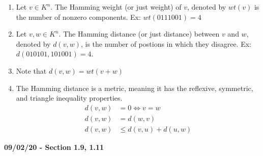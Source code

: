 \documentclass[11pt]{article}
\newcommand{\skipline}{\vspace{\baselineskip}}
\begin{document}
\begin{enumerate}
		\newpage
		\item Let $v \in K^n$. The Hamming weight (or just weight) of $v$, denoted by $wt(v)$ is the number of nonzero components. Ex: $wt(0111001) = 4$ 
		\item Let $v,w \in K^n$. The Hamming distance (or just distance) between $v$ and $w$, denoted by $d(v,w)$, is the number of postions in which they disagree. Ex: $d(010101,101001) = 4$. 
		\item Note that $d(v,w) = wt(v + w)$
		\item The Hamming distance is a metric, meaning it has the reflexive, symmetric, and triangle inequality properties.
		\begin{align*}
			d(v,w) &= 0 \Longleftrightarrow v = w \tag{Reflexive} \\
			d(v,w) &= d(w,v) \tag{Symmetric} \\
			d(v,w) &\leq d(v,u) + d(u,w) \tag{Triangle Inequality} 
		\end{align*}
	\end{enumerate}
	\skipline
	\textbf{09/02/20 - Section 1.9, 1.11}
\end{document}
